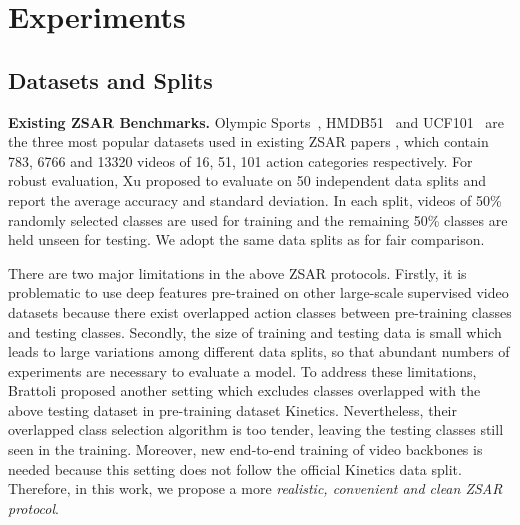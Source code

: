 \section{Experiments}


\subsection{Datasets and Splits}
\noindent\textbf{Existing ZSAR Benchmarks.}
Olympic Sports~\cite{niebles2010modeling}, HMDB51~\cite{kuehne2011hmdb} and UCF101~\cite{soomro2012ucf101} are the three most popular datasets used in existing ZSAR papers \cite{junior2019zero}, which contain 783, 6766 and 13320 videos of 16, 51, 101 action categories respectively.
For robust evaluation, Xu \etal \cite{xu2017transductive} proposed to evaluate on 50 independent data splits and report the average accuracy and standard deviation.
In each split, videos of 50\% randomly selected classes are used for training and the remaining 50\% classes are held unseen for testing.
We adopt the same data splits as \cite{xu2017transductive} for fair comparison.

There are two major limitations in the above ZSAR protocols.
Firstly, it is problematic to use deep features pre-trained on other large-scale supervised video datasets because there exist overlapped action classes between pre-training classes and testing classes.
Secondly, the size of training and testing data is small which leads to large variations among different data splits, so that abundant numbers of experiments are necessary to evaluate a model.
To address these limitations, Brattoli \etal \cite{brattoli2020rethinking} proposed another setting which excludes classes overlapped with the above testing dataset in pre-training dataset Kinetics.
Nevertheless, their overlapped class selection algorithm is too tender, leaving the testing classes still seen in the training. Moreover, new end-to-end training of video backbones is needed because this setting does not follow the official Kinetics data split.
Therefore, in this work, we propose a more \emph{realistic, convenient and clean ZSAR protocol}.

